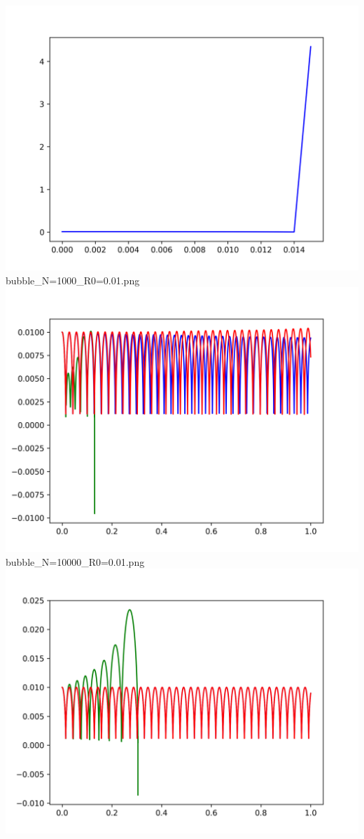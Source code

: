 \documentclass[a4paper,14pt]{article}
\begin{document}
\includegraphics[scale=0.5]{images/graphs/bubble_N=1000_R0=0.01.png}\newline
bubble\_N=1000\_R0=0.01.png\newline
\includegraphics[scale=0.5]{images/graphs/bubble_N=10000_R0=0.01.png}\newline
bubble\_N=10000\_R0=0.01.png\newline
\includegraphics[scale=0.5]{images/graphs/bubble_N=100000_R0=0.01.png}\newline
\end{document}
